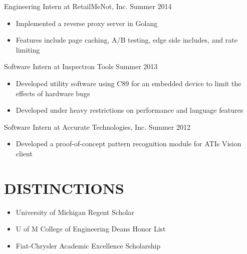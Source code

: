 \documentclass[line,margin]{res}
\begin{document}
\begin{resume}
                {\sc Engineering Intern at RetailMeNot, Inc.} \hfill Summer 2014
                 \begin{itemize}  \itemsep -2pt %
                 \item Implemented a reverse proxy server in Golang
                 \item Features include page caching, A/B testing, edge side includes, and rate limiting
                 \end{itemize}

                {\sc Software Intern at Inspectron Tools} \hfill Summer 2013
                 \begin{itemize}  \itemsep -2pt %
                 \item Developed utility software using C89 for an embedded device to limit the effects of hardware bugs
                 \item Developed under heavy restrictions on performance and language features
                 \end{itemize}
 
                {\sc Software Intern at Accurate Technologies, Inc.} \hfill            Summer 2012
                 \begin{itemize}  \itemsep -2pt %
                 \item Developed a proof-of-concept pattern recognition module for ATI\textquotesingle s Vision client
                 \end{itemize} 

\section{\textcolor{HeaderColor}{DISTINCTIONS}}
    \begin{itemize} \itemsep-0.2em
    \item University of Michigan Regent Scholar
    \item U of M College of Engineering Dean\textquotesingle s Honor List
    \item Fiat-Chrysler Academic Excellence Scholarship
    \end{itemize}
 

\end{resume}
\end{document}
